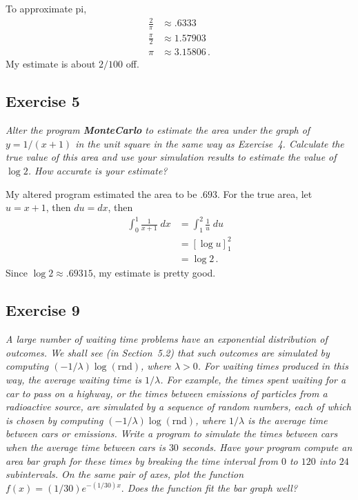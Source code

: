 \documentclass{tufte-handout}
\begin{document}
To approximate pi,
\begin{align*}
  \frac{2}{\pi} & \approx .6333 \\
  \frac{\pi}{2} & \approx 1.57903 \\
  \pi & \approx 3.15806 \, .
\end{align*}
My estimate is about $2/100$ off.

\subsection{Exercise 5}
\begin{description}
\item \textit{Alter the program \textbf{MonteCarlo} to estimate the
    area under the graph of $y = 1/(x+1)$ in the unit square in the
    same way as Exercise~4. Calculate the true value of this area and
    use your simulation results to estimate the value of
    $\log{2}$. How accurate is your estimate?}
\end{description}

My altered program estimated the area to be $.693$. For the true area,
let $u = x + 1$, then $du = dx$, then
\begin{align*}
 \int_0^1 \frac{1}{x+1} \; dx &= \int_1^2 \frac{1}{u} \;
 du \\
 &= \left[ \log{u} \right]_1^2 \\
 &= \log{2} \, .
\end{align*}
Since $\log{2} \approx .69315$, my estimate is pretty good.

\subsection{Exercise 9}
\begin{description}
\item \textit{A large number of waiting time problems have an
    exponential distribution of outcomes. We shall see (in
    Section~5.2) that such outcomes are simulated by computing
    $(-1/\lambda)\log{(\mathrm{rnd})}$, where $\lambda > 0$. For
    waiting times produced in this way, the average waiting time is
    $1/\lambda$. For example, the times spent waiting for a car to
    pass on a highway, or the times between emissions of particles
    from a radioactive source, are simulated by a sequence of random
    numbers, each of which is chosen by computing
    $(-1/\lambda)\log{(\mathrm{rnd})}$, where $1/\lambda$ is the
    average time between cars or emissions. Write a program to
    simulate the times between cars when the average time between cars
    is $30$ seconds. Have your program compute an area bar graph for
    these times by breaking the time interval from $0$ to $120$ into
    $24$ subintervals. On the same pair of axes, plot the function
    $f(x) = (1/30)e^{-(1/30)x}.$ Does the function fit the bar graph
    well?}
\end{description}
\end{document}
